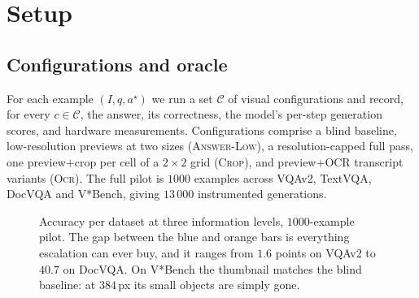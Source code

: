 \documentclass[10pt,twocolumn]{article}
\theoremstyle{plain}
\newcommand{\answerlow}{\textsc{Answer-Low}}
\newcommand{\crop}{\textsc{Crop}}
\newcommand{\ocr}{\textsc{Ocr}}
\begin{document}
\section{Setup}

\subsection{Configurations and oracle}

For each example $(I, q, a^\star)$ we run a set $\mathcal{C}$ of visual
configurations and record, for every $c \in \mathcal{C}$, the answer,
its correctness, the model's per-step generation scores, and hardware
measurements. Configurations comprise a blind baseline, low-resolution previews
at two sizes (\answerlow), a resolution-capped full pass, one preview$+$crop per
cell of a $2\times2$ grid (\crop), and preview$+$OCR transcript variants
(\ocr). The full pilot is $1000$ examples across VQAv2, TextVQA, DocVQA and
V*Bench, giving $13\,000$ instrumented generations.

\begin{figure}[t]
\centering
{}
\caption{Accuracy per dataset at three information levels, $1000$-example
pilot. The gap between the blue and orange bars is everything escalation can
ever buy, and it ranges from $1.6$ points on VQAv2 to $40.7$ on DocVQA. On
V*Bench the thumbnail matches the blind baseline: at $384$\,px its small
objects are simply gone.}
\label{fig:domainbars}
\end{figure}
\end{document}

